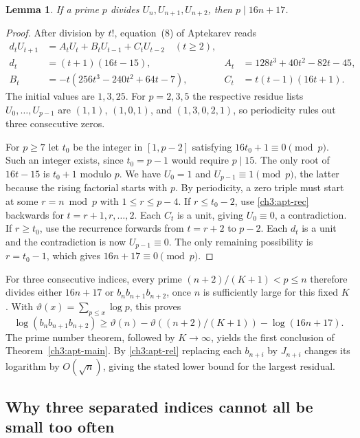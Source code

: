 \documentclass[11pt,a4paper,oneside,openany]{report}
\newtheorem{lemma}[theorem]{Lemma}\newtheorem{proposition}[theorem]{Proposition}
\theoremstyle{remark}\newtheorem{remark}[theorem]{Remark}
\numberwithin{equation}{section}
\begin{document}
\begin{lemma}\label{ch3:apt-reset}
If a prime $p$ divides $U_n,U_{n+1},U_{n+2}$, then $p\mid16n+17$.
\end{lemma}
\begin{proof}
After division by $t!$, equation~(8) of Aptekarev \cite{apt-orig} reads
\begin{align}
 d_tU_{t+1}&=A_tU_t+B_tU_{t-1}+C_tU_{t-2}\quad(t\ge2),\label{ch3:apt-rec}\\
 d_t&=(t+1)(16t-15),&
 A_t&=128t^3+40t^2-82t-45,\nonumber\\
 B_t&=-t(256t^3-240t^2+64t-7),&
 C_t&=t(t-1)(16t+1).\nonumber
\end{align}
The initial values are $1,3,25$. For $p=2,3,5$ the respective residue
lists $U_0,\ldots,U_{p-1}$ are $(1,1)$, $(1,0,1)$, and
$(1,3,0,2,1)$, so periodicity rules out three consecutive zeros.

For $p\ge7$ let $t_0$ be the integer in $[1,p-2]$ satisfying
$16t_0+1\equiv0\pmod p$. Such an integer exists, since $t_0=p-1$
would require $p\mid15$. The only root of $16t-15$ is $t_0+1$
modulo $p$. We have $U_0=1$ and $U_{p-1}\equiv1\pmod p$, the latter
because the rising factorial starts with $p$. By periodicity, a zero
triple must start at some $r=n\bmod p$ with $1\le r\le p-4$.
If $r\le t_0-2$, use \eqref{ch3:apt-rec} backwards for
$t=r+1,r,\ldots,2$. Each $C_t$ is a unit, giving $U_0\equiv0$,
a contradiction. If $r\ge t_0$, use the recurrence forwards from
$t=r+2$ to $p-2$. Each $d_t$ is a unit and the contradiction is now
$U_{p-1}\equiv0$. The only remaining possibility is $r=t_0-1$,
which gives $16n+17\equiv0\pmod p$.
\end{proof}

For three consecutive indices, every prime $(n+2)/(K+1)<p\le n$
therefore divides either $16n+17$ or $b_n b_{n+1} b_{n+2}$, once $n$
is sufficiently large for this fixed $K$. With
$\vartheta(x)=\sum_{p\le x}\log p$, this proves
\[
 \log(b_n b_{n+1} b_{n+2})
 \ge \vartheta(n)-\vartheta((n+2)/(K+1))-\log(16n+17).
\]
The prime number theorem, followed by $K\to\infty$, yields the first
conclusion of Theorem~\ref{ch3:apt-main}. By \eqref{ch3:apt-rel} replacing
each $b_{n+i}$ by $J_{n+i}$ changes its logarithm by $O(\sqrt n)$,
giving the stated lower bound for the largest residual.

\subsection{Why three separated indices cannot all be small too often}
\end{document}
